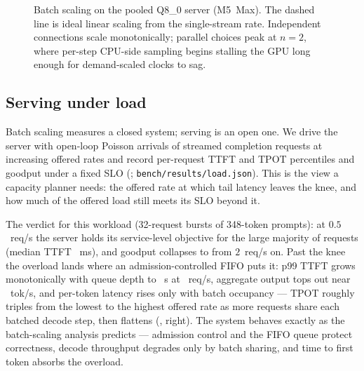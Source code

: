 \documentclass[sigconf,nonacm,screen]{acmart}
\newcommand{\code}[1]{\texttt{\small #1}}
\begin{document}
\begin{figure}[t]\centering
{}
\caption{Batch scaling on the pooled Q8\_0 server (M5~Max). The dashed line
is ideal linear scaling from the single-stream rate. Independent
connections scale monotonically; parallel choices peak at $n{=}2$, where
per-step CPU-side sampling begins stalling the GPU long enough for
demand-scaled clocks to sag.}
\label{fig:batch}
\end{figure}

\subsection{Serving under load}
\label{sec:eval-load}
Batch scaling measures a closed system; serving is an open one. We drive the
server with open-loop Poisson arrivals of streamed completion requests at
increasing offered rates and record per-request TTFT and TPOT percentiles
and goodput under a fixed SLO (;
\code{bench/results/load.json}). This is the view a capacity planner needs:
the offered rate at which tail latency leaves the knee, and how much of the
offered load still meets its SLO beyond it.

The verdict for this workload (32-request bursts of 348-token prompts): at
$0.5$~req/s the server holds its service-level objective for the large
majority of requests (median TTFT \LoadTtftPFiftyLow~ms), and goodput
collapses to \LoadGoodputHigh{} from $2$~req/s on. Past the knee the
overload lands where an admission-controlled FIFO puts it: p99 TTFT grows
monotonically with queue depth to \LoadTtftPNinetyNineHigh~s at
\LoadRateHigh~req/s, aggregate output tops out near \LoadPeakTps~tok/s,
and per-token latency rises only with batch occupancy --- TPOT roughly
triples from the lowest to the highest offered rate as more requests share
each batched decode step, then flattens (, right). The
system behaves exactly as the
batch-scaling analysis predicts --- admission control and the FIFO queue
protect correctness, decode throughput degrades only by batch sharing, and
time to first token absorbs the overload.
\end{document}
